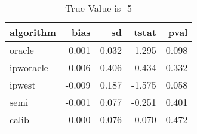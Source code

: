 \begin{table}

\caption{True Value is -5}
\centering
\begin{tabular}[t]{lrrrr}
\toprule
algorithm & bias & sd & tstat & pval\\
\midrule
oracle & 0.001 & 0.032 & 1.295 & 0.098\\
ipworacle & -0.006 & 0.406 & -0.434 & 0.332\\
ipwest & -0.009 & 0.187 & -1.575 & 0.058\\
semi & -0.001 & 0.077 & -0.251 & 0.401\\
calib & 0.000 & 0.076 & 0.070 & 0.472\\
\bottomrule
\end{tabular}
\end{table}